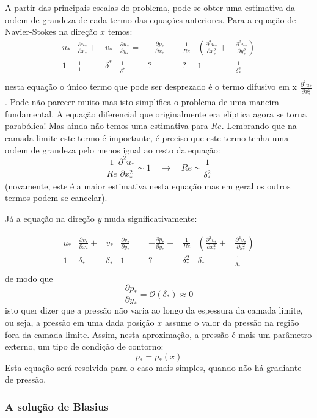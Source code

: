 \documentclass[article,12pt,oneside,a4paper,english,brazil,sumario=tradicional]{abntex2}
\newcommand{\lra}{\ensuremath{\longrightarrow}}
\newcommand{\qrq}{\ensuremath{\quad\lra\quad}}
\newcommand{\bigO}[1]{\ensuremath{\mathcal{O}\left(#1\right)}}
\begin{document}
A partir das principais escalas do problema, pode-se obter uma estimativa da ordem de grandeza de cada termo das equações anteriores. Para a equação de Navier-Stokes na direção $x$ temos:
\[
\begin{matrix}
 u_*&\frac{\partial u_*}{\partial x_*} + &v_*&\frac{\partial u_*}{\partial y_*} =& 
-\frac{\partial p_*}{\partial x_*} + &\frac{1}{Re} &\left( \frac{\partial^2 u_*}{\partial x_*^2}\right. +& \left.\frac{\partial^2 u_*}{\partial y_*^2}\right) \\
1 & \frac{1}{1} & \delta^* & \frac{1}{\delta^*} & ? & ? & 1 & \frac{1}{\delta_*^2} \\
\end{matrix}
\]
nesta equação o único termo que pode ser desprezado é o termo difusivo em x $\frac{\partial^2 u_*}{\partial x_*^2}$. Pode não parecer muito mas isto simplifica o problema de uma maneira fundamental. A equação diferencial que originalmente era elíptica agora se torna parabólica! Mas ainda não temos uma estimativa para $Re$. Lembrando que na camada limite este termo é importante, é preciso que este termo tenha uma ordem de grandeza pelo menos igual ao resto da equação:
\[
\frac{1}{Re} \frac{\partial^2 u_*}{\partial x_*^2} \sim 1 \qrq Re \sim \frac{1}{\delta_*^2}
\]
(novamente, este é a maior estimativa nesta equação mas em geral os outros termos podem se cancelar).

Já a equação na direção $y$ muda significativamente:

\[
\begin{matrix}
u_*&\frac{\partial v_*}{\partial x_*} + &v_*&\frac{\partial v_*}{\partial y_*} =& 
-\frac{\partial p_*}{\partial y_*} + &\frac{1}{Re} &\left( \frac{\partial^2 v_*}{\partial x_*^2}\right. +& \left.\frac{\partial^2 v_*}{\partial y_*^2}\right) \\
 1 & \delta_* & \delta_* & 1 & ? & \delta_*^2 & \delta_* & \frac{1}{\delta_*} \\
\end{matrix}
\]
de modo que 
\[
\frac{\partial p_*}{\partial y_*} = \bigO{\delta_*} \approx 0
\]
isto quer dizer que a pressão não varia ao longo da espessura da camada limite, ou seja, a pressão em uma dada posição $x$ assume o valor da pressão na região fora da camada limite. Assim, nesta aproximação, a pressão é mais um parâmetro externo, um tipo de condição de contorno:
\[
p_* = p_*(x)
\]
Esta equação será resolvida para o caso mais simples, quando não há gradiante de pressão.

\subsubsection{A solução de Blasius}
\end{document}
